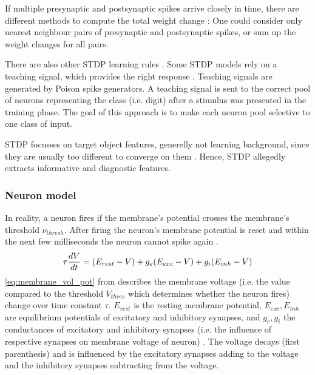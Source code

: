 If multiple presynaptic and postsynaptic spikes arrive closely in time, there are different methods to compute the total weight change \cite{simulation_STDP}:
One could consider only nearest neighbour pairs of presynaptic and postsynaptic spikes, or sum up the weight changes for all pairs.

There are also other \ac{STDP} learning rules \cite{SNN}.
Some \ac{STDP} models rely on a teaching signal, which provides the right response \cite{STDP_like}.
Teaching signals are generated by Poison spike generators.
A teaching signal is sent to the correct pool of neurons representing the class (i.e. digit) after a stimulus was presented in the training phase.
The goal of this approach is to make each neuron pool selective to one class of input.

\ac{STDP} focusses on target object features, generelly not learning background, since they are usually too different to converge on them \cite{multi_scale_STDP}.
Hence, \ac{STDP} allegedly extracts informative and diagnostic features.


\subsubsection{Neuron model}
\label{subsubsec:neuron_model}
In reality, a neuron fires if the membrane's potential crosses the membrane's threshold $\nu_{thresh}$.
After firing the neuron's membrane potential is reset and within the next few milliseconds the neuron cannot spike again \cite{SNN}.
%
\begin{equation}
    \centering
    \label{eq:membrane_vol_pot}
    \tau \frac{dV}{dt} = (E_{rest} - V) + g_e(E_{exc} - V) + g_i(E_{inh} - V)
\end{equation}
%
\autoref{eq:membrane_vol_pot} from \cite{SNN} describes the membrane voltage 
(i.e. the value compared to the threshold $V_{thres}$ which determines whether the neuron fires) change over time constant $\tau$.
$E_{rest}$ is the resting membrane potential, $E_{exc}, E_{inh}$ are equilibrium potentials of excitatory and inhibitory synapses, 
and $g_e, g_i$ the conductances of excitatory and inhibitory synapses (i.e. the influence of respective synapses on membrane voltage of neuron) \cite{SNN}. 
The voltage decays (first parenthesis) and is influenced by the excitatory synapses 
adding to the voltage and the inhibitory synapses subtracting from the voltage.


